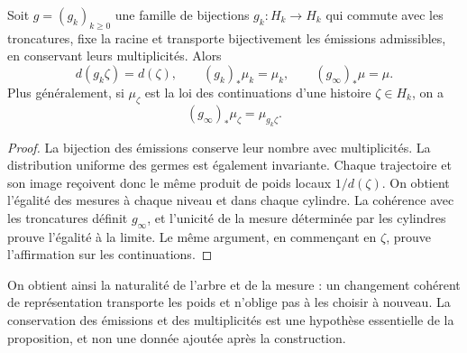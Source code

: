 \begin{proposition}
\label{x_reciprocidad:prop:ch-naturalidad-medida}
Soit \(g=(g_k)_{k\geq0}\) une famille de bijections \(g_k:H_k\to H_k\)
qui commute avec les troncatures, fixe la racine et transporte bijectivement
les émissions admissibles, en conservant leurs multiplicités. Alors
\[
 d(g_k\zeta)=d(\zeta),\qquad
 (g_k)_*\mu_k=\mu_k,\qquad (g_\infty)_*\mu=\mu.
\]
Plus généralement, si \(\mu_\zeta\) est la loi des continuations d'une
histoire \(\zeta\in H_k\), on a
\[
 (g_\infty)_*\mu_\zeta=\mu_{g_k\zeta}.
\]
\end{proposition}

\begin{proof}
La bijection des émissions conserve leur nombre avec multiplicités. La
distribution uniforme des germes est également invariante. Chaque trajectoire
et son image reçoivent donc le même produit de poids locaux
\(1/d(\zeta)\). On obtient l'égalité des mesures à chaque niveau et dans
chaque cylindre. La cohérence avec les troncatures définit \(g_\infty\),
et l'unicité de la mesure déterminée par les cylindres prouve l'égalité
à la limite. Le même argument, en commençant en \(\zeta\), prouve
l'affirmation sur les continuations.
\end{proof}

On obtient ainsi la naturalité de l'arbre et de la mesure : un changement cohérent
de représentation transporte les poids et n'oblige pas à les choisir à nouveau.
La conservation des émissions et des multiplicités est une hypothèse essentielle de
la proposition, et non une donnée ajoutée après la construction.

